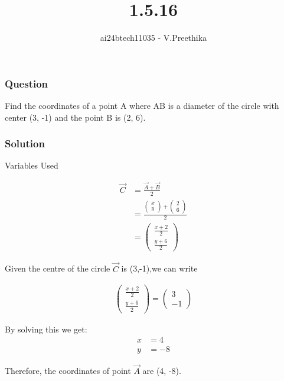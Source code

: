 \documentclass{beamer}
\newcommand{\createMat}[2]{\begin{pmatrix} #1 \\ #2 \end{pmatrix}}
\begin{document}
\title{1.5.16}
\author{ai24btech11035 - V.Preethika}
\date{}
\frame{\titlepage}

\begin{frame}
\frametitle{Question}
Find the coordinates of a point A where AB is a diameter of the circle with center (3, -1) and the point B is (2, 6).\\
\end{frame}

\begin{frame}[allowframebreaks]
\frametitle{Solution}
\begin{table}[htbp]
\centering
  
	\caption{Variables Used}
	\label{tab1.5.16}
\end{table}
	\begin{align}
    \vec{C} &= \frac{\vec{A}+\vec{B}}{2} \\
		&= \frac{\createMat{x}{y} + \createMat{2}{6}}{2} \\
		&= \createMat{\frac{x+2}{2}}{\frac{y+6}{2}}
	\end{align}
	  
    
		Given the centre of the circle $\vec{C}$ is (3,-1),we can write
    
		\begin{align}
			\createMat{\frac{x + 2}{2}}{\frac{y + 6}{2}} =\createMat{3}{-1}
		\end{align}
    
    By solving this we get:
    \begin{align}
	    x &= 4 \\
	    y &= -8
    \end{align}

    
    Therefore, the coordinates of point $\vec{A}$ are (4, -8).
\end{frame}
\end{document}

